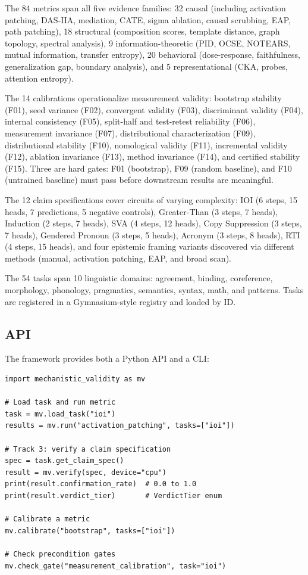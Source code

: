 \documentclass[10pt]{article}
\begin{document}
The 84 metrics span all five evidence families: 32 causal (including activation patching, DAS-IIA, mediation, CATE, sigma ablation, causal scrubbing, EAP, path patching), 18 structural (composition scores, template distance, graph topology, spectral analysis), 9 information-theoretic (PID, OCSE, NOTEARS, mutual information, transfer entropy), 20 behavioral (dose-response, faithfulness, generalization gap, boundary analysis), and 5 representational (CKA, probes, attention entropy).

The 14 calibrations operationalize measurement validity: bootstrap stability (F01), seed variance (F02), convergent validity (F03), discriminant validity (F04), internal consistency (F05), split-half and test-retest reliability (F06), measurement invariance (F07), distributional characterization (F09), distributional stability (F10), nomological validity (F11), incremental validity (F12), ablation invariance (F13), method invariance (F14), and certified stability (F15). Three are hard gates: F01 (bootstrap), F09 (random baseline), and F10 (untrained baseline) must pass before downstream results are meaningful.

The 12 claim specifications cover circuits of varying complexity: IOI (6 steps, 15 heads, 7 predictions, 5 negative controls), Greater-Than (3 steps, 7 heads), Induction (2 steps, 7 heads), SVA (4 steps, 12 heads), Copy Suppression (3 steps, 7 heads), Gendered Pronoun (3 steps, 5 heads), Acronym (3 steps, 8 heads), RTI (4 steps, 15 heads), and four epistemic framing variants discovered via different methods (manual, activation patching, EAP, and broad scan).

The 54 tasks span 10 linguistic domains: agreement, binding, coreference, morphology, phonology, pragmatics, semantics, syntax, math, and patterns. Tasks are registered in a Gymnasium-style registry and loaded by ID.

\subsection{API}
\label{sec:api}

The framework provides both a Python API and a CLI:

\begin{verbatim}
import mechanistic_validity as mv

# Load task and run metric
task = mv.load_task("ioi")
results = mv.run("activation_patching", tasks=["ioi"])

# Track 3: verify a claim specification
spec = task.get_claim_spec()
result = mv.verify(spec, device="cpu")
print(result.confirmation_rate)  # 0.0 to 1.0
print(result.verdict_tier)       # VerdictTier enum

# Calibrate a metric
mv.calibrate("bootstrap", tasks=["ioi"])

# Check precondition gates
mv.check_gate("measurement_calibration", task="ioi")
\end{verbatim}
\end{document}
